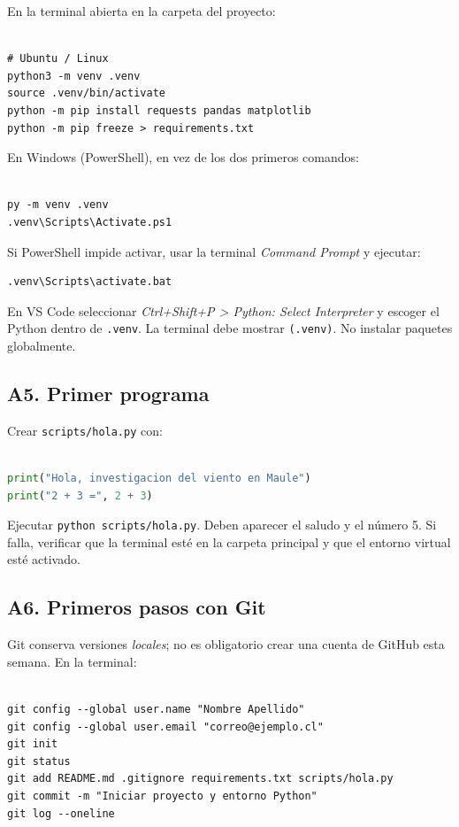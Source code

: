 \documentclass[11pt,a4paper]{article}
\begin{document}
En la terminal abierta en la carpeta del proyecto:

\begin{lstlisting}

# Ubuntu / Linux
python3 -m venv .venv
source .venv/bin/activate
python -m pip install requests pandas matplotlib
python -m pip freeze > requirements.txt
\end{lstlisting}

En Windows (PowerShell), en vez de los dos primeros comandos:

\begin{lstlisting}

py -m venv .venv
.venv\Scripts\Activate.ps1
\end{lstlisting}

Si PowerShell impide activar, usar la terminal \emph{Command Prompt} y ejecutar:

\begin{lstlisting}
.venv\Scripts\activate.bat
\end{lstlisting}

En VS Code seleccionar \emph{Ctrl+Shift+P > Python: Select Interpreter} y escoger el Python dentro de \texttt{.venv}. La terminal debe mostrar \texttt{(.venv)}. No instalar paquetes globalmente.

\subsection*{A5. Primer programa}

Crear \texttt{scripts/hola.py} con:

\begin{lstlisting}[language=Python]

print("Hola, investigacion del viento en Maule")
print("2 + 3 =", 2 + 3)
\end{lstlisting}

Ejecutar \texttt{python scripts/hola.py}. Deben aparecer el saludo y el número 5. Si falla, verificar que la terminal esté en la carpeta principal y que el entorno virtual esté activado.

\subsection*{A6. Primeros pasos con Git}

Git conserva versiones \emph{locales}; no es obligatorio crear una cuenta de GitHub esta semana. En la terminal:

\begin{lstlisting}

git config --global user.name "Nombre Apellido"
git config --global user.email "correo@ejemplo.cl"
git init
git status
git add README.md .gitignore requirements.txt scripts/hola.py
git commit -m "Iniciar proyecto y entorno Python"
git log --oneline
\end{lstlisting}
\end{document}
